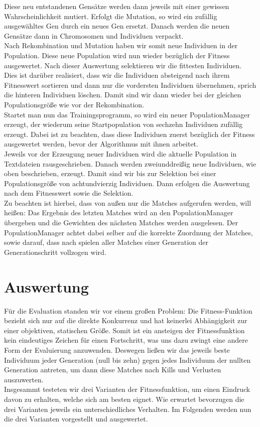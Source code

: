 \documentclass[
	12pt,
	a4paper,
	BCOR10mm,
	DIV14,
	headsepline,
	usegeometry,
]{scrreprt}
\begin{document}
Diese neu entstandenen Gensätze werden dann jeweils mit einer gewissen Wahrscheinlichkeit mutiert. Erfolgt die Mutation, so wird ein zufällig ausgewähltes Gen durch ein neues Gen ersetzt. Danach werden die neuen Gensätze dann in Chromosomen und Individuen verpackt.\\
Nach Rekombination und Mutation haben wir somit neue Individuen in der Population. Diese neue Population wird nun wieder bezüglich der Fitness ausgewertet. Nach dieser Auswertung selektieren wir die fittesten Individuen. Dies ist darüber realisiert, dass wir die Individuen absteigend nach ihrem Fitnesswert sortieren und dann nur die vordersten Individuen übernehmen, sprich die hinteren Individuen löschen. Damit sind wir dann wieder bei der gleichen Populationsgröße wie vor der Rekombination.\\
Startet man nun das Trainingsprogramm, so wird ein neuer PopulationManager erzeugt, der wiederum seine Startpopulation von sechzehn Individuen zufällig erzeugt. Dabei ist zu beachten, dass diese Individuen zuerst bezüglich der Fitness ausgewertet werden, bevor der Algorithmus mit ihnen arbeitet.\\
Jeweils vor der Erzeugung neuer Individuen wird die aktuelle Population in Textdateien rausgeschrieben. Danach werden zweiunddreißig neue Individuen, wie oben beschrieben, erzeugt. Damit sind wir bis zur Selektion bei einer Populationsgröße von achtundvierzig Individuen. Dann erfolgen die Auswertung nach dem Fitnesswert sowie die Selektion.\\
Zu beachten ist hierbei, dass von außen nur die Matches aufgerufen werden, will heißen: Das Ergebnis des letzten Matches wird an den PopulationManager übergeben und die Gewichten des nächsten Matches werden ausgelesen. Der PopulationManager achtet dabei selber auf die korrekte Zuordnung der Matches, sowie darauf, dass nach spielen aller Matches einer Generation der Generationschritt vollzogen wird.

\chapter{Auswertung}
\label{Auswertung}
Für die Evaluation standen wir vor einem großen Problem: Die Fitness-Funktion bezieht sich nur auf die direkte Konkurrenz und hat keinerlei Abhängigkeit zur einer objektiven, statischen Größe. Somit ist ein ansteigen der Fitnessfunktion kein eindeutiges Zeichen für einen Fortschritt, was uns dazu zwingt eine andere Form der Evaluierung anzuwenden. Deswegen ließen wir das jeweils beste Individuum jeder Generation (null bis zehn) gegen jedes Individuum der nullten Generation antreten, um dann diese Matches nach Kills und Verlusten auszuwerten.\\
Insgesammt testeten wir drei Varianten der Fitnessfunktion, um einen Eindruck davon zu erhalten, welche sich am besten eignet. Wie erwartet bevorzugen die drei Varianten jeweils ein unterschiedliches Verhalten. Im Folgenden werden nun die drei Varianten vorgestellt und ausgewertet.
\end{document}

